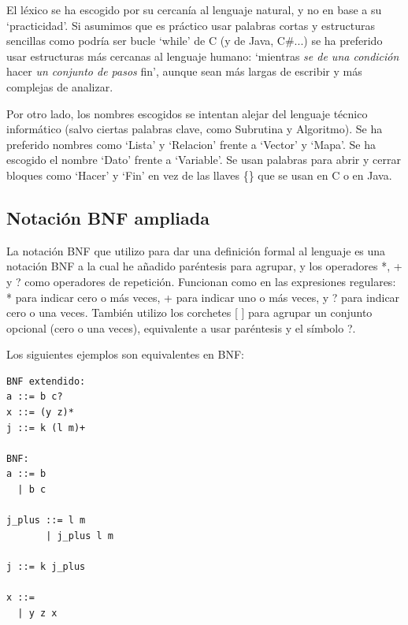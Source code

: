 \documentclass{report}
\begin{document}
	\vspace{10px}
	
	El léxico se ha escogido por su cercanía al lenguaje natural, y no en base a su `practicidad'. Si asumimos que es práctico usar palabras cortas y estructuras sencillas como podría ser bucle `while' de C (y de Java, C\#...) se ha preferido usar estructuras más cercanas al lenguaje humano: `mientras \textit{se de una condición} hacer \textit{un conjunto de pasos} fin', aunque sean más largas de escribir y más complejas de analizar.
	
	\vspace{10px}
	
	Por otro lado, los nombres escogidos se intentan alejar del lenguaje técnico informático (salvo ciertas palabras clave, como Subrutina y Algoritmo). Se ha preferido nombres como `Lista' y `Relacion' frente a `Vector' y `Mapa'. Se ha escogido el nombre `Dato' frente a `Variable'. Se usan palabras para abrir y cerrar bloques como `Hacer' y `Fin' en vez de las llaves \{\} que se usan en C o en Java. 
	
	\vspace{10px}
	
	\subsection{Notación BNF ampliada}
	
	La notación BNF que utilizo para dar una definición formal al lenguaje es una notación BNF a la cual he añadido paréntesis para agrupar, y los operadores *, + y ? como operadores de repetición. Funcionan como en las expresiones regulares: * para indicar cero o más veces, + para indicar uno o más veces, y ? para indicar cero o una veces. También utilizo los corchetes [
	] para agrupar un conjunto opcional (cero o una veces), equivalente a usar paréntesis y el símbolo ?.
	
	\vspace{10px}
	
	Los siguientes ejemplos son equivalentes en BNF:
	
	\begin{BVerbatim}
BNF extendido:
a ::= b c?
x ::= (y z)*
j ::= k (l m)+
	
BNF:
a ::= b
  | b c

j_plus ::= l m
       | j_plus l m	

j ::= k j_plus

x ::= 
  | y z x
	\end{BVerbatim}
	
\end{document}
